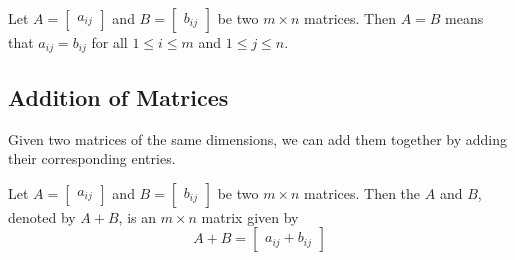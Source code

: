\documentclass{ximera}
\begin{document}
\begin{definition}\label{def:equalityofmatrices}
 Let $A=\begin{bmatrix} a_{ij}\end{bmatrix}$ and $B=\begin{bmatrix} b_{ij}\end{bmatrix}$ be two $m \times n$ matrices. Then $A=B$ means
that $a_{ij}=b_{ij}$ for all $1\leq i\leq m$ and 
$1\leq j\leq n$.
\end{definition}

\subsection*{Addition of Matrices}

Given two matrices of the same dimensions, we can add them together by adding their corresponding entries.
\begin{definition}\label{def:additionofmatrices}
Let $A=\begin{bmatrix} a_{ij}\end{bmatrix} $ and $B=\begin{bmatrix} b_{ij}\end{bmatrix}$ be two
$m\times n$ matrices. Then the  $A$ and $B$, denoted by $A+B$,  is an $m \times n$
matrix  given by 
$$A+B=\begin{bmatrix}a_{ij}+b_{ij}\end{bmatrix}$$

\end{definition}
\end{document}
